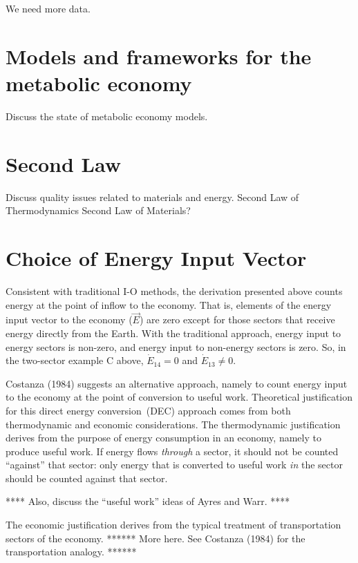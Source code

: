 We need more data. 


\section{Models and frameworks for the metabolic economy}
\label{sec:metabolic_models}

Discuss the state of metabolic economy models.


\section{Second Law}
\label{sec:second_law}

Discuss quality issues related to materials and energy.
Second Law of Thermodynamics
Second Law of Materials?


\section{Choice of Energy Input Vector}
\label{sec:energy_input_vector}

Consistent with traditional I-O methods, 
the derivation presented above counts energy at the point of inflow to the economy. 
That is, elements of the energy input vector to the economy
($\vec{E}$) are zero except for those sectors 
that receive energy directly from the Earth. 
With the traditional approach, 
energy input to energy sectors is non-zero, 
and energy input to non-energy sectors is zero. 
So, in the two-sector example C above, 
$\dot{E}_{14} = 0$ and $\dot{E}_{13} \neq 0$. 

Costanza (1984) suggests an alternative approach, 
namely to count energy input to the economy 
at the point of conversion to useful work. 
Theoretical justification for this direct energy conversion~(DEC) 
approach comes from both thermodynamic and economic considerations. 
The thermodynamic justification derives from the purpose 
of energy consumption in an economy, 
namely to produce useful work. 
If energy flows \emph{through} a sector, 
it should not be counted ``against'' that sector: 
only energy that is converted to useful work \emph{in} 
the sector should be counted against that sector.

**** Also, discuss the ``useful work'' ideas of Ayres and Warr. ****

The economic justification derives 
from the typical treatment of transportation sectors of the economy. 
****** More here. See Costanza (1984) for the transportation analogy. ******

